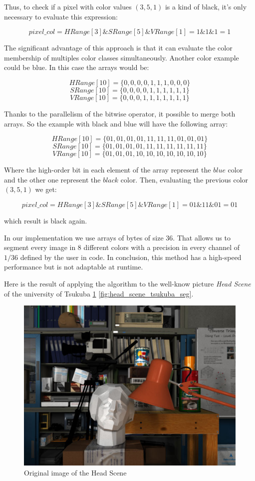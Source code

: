 Thus, to check if a pixel with color values $(3, 5, 1)$ is a kind of black, it's only necessary to evaluate this expression: 

\[ pixel\_col = HRange[3] \& SRange[5] \& VRange[1] = 1 \& 1 \& 1 = 1 \]

The significant advantage of this approach is that it can evaluate the color membership of multiples color classes simultaneously. Another color example could be blue. In this case the arrays would be:

{\centering
\[HRange[10] = \{0, 0, 0, 0, 1, 1, 1, 0, 0, 0\}\]
\[SRange[10] = \{0, 0, 0, 0, 1, 1, 1, 1, 1, 1\}\]
\[VRange[10] = \{0, 0, 0, 1, 1, 1, 1, 1, 1, 1\}\]
}

Thanks to the parallelism of the bitwise operator, it possible to merge both arrays. So the example with black and blue will have the following array:

{\centering
\[HRange[10] = \{01, 01, 01, 01, 11, 11, 11, 01, 01, 01\}\]
\[SRange[10] = \{01, 01, 01, 01, 11, 11, 11, 11, 11, 11\}\]
\[VRange[10] = \{01, 01, 01, 10, 10, 10, 10, 10, 10, 10\}\] 
} 

Where the high-order bit in each element  of the array represent the $blue$ color and the other one represent the $black$ color. Then, evaluating the previous color $(3,5,1)$ we get: 

\[pixel\_col = HRange[3] \& SRange[5] \& VRange[1] = 01 \& 11 \& 01 = 01\]

which result is black again.

In our implementation we use arrays of bytes of size 36. That allows us to segment every image in 8 different colors with a precision in every channel of $1/36$ defined by the user in code. In conclusion, this method has a high-speed performance but is not adaptable at runtime.

Here is the result of applying the algorithm to the well-know picture \textit{Head Scene} of the university of Tsukuba \ref{fig:head_scene_tsukuba_ori} \ref{fig:head_scene_tsukuba_seg}.


\begin{figure}[h]
	\centering
	\includegraphics[width=0.5\linewidth]{../Images/c2/head_scene_tsukuba_ori}
	\caption{Original image of the Head Scene}
	\label{fig:head_scene_tsukuba_ori}
\end{figure}


